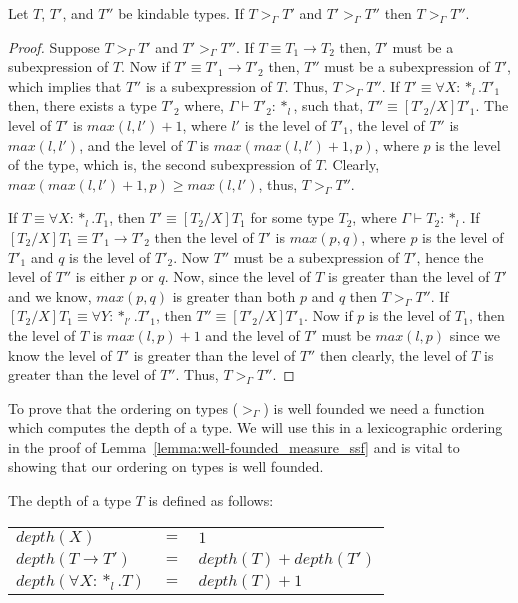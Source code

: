 \begin{lemma}
  Let $T$, $T'$, and $T''$ be kindable types.  If $T >_\Gamma T'$ and 
  $T' >_\Gamma T''$ then $T >_\Gamma T''$.
  \label{lemma:transitivity_ssf}
\end{lemma}
\begin{proof}
  Suppose $T >_\Gamma T'$ and $T' >_\Gamma T''$.  If 
  $T \equiv T_1 \rightarrow T_2$ then,
  $T'$ must be a subexpression of $T$.  Now if $T' \equiv T'_1 \rightarrow T'_2$ 
  then,
  $T''$ must be a subexpression of $T'$, which implies that $T''$ is a subexpression of 
  $T$.  Thus, $T >_\Gamma T''$.
  If $T' \equiv \forall X:*_l.T'_1$ then, there exists a type $T'_2$ where, 
  $\Gamma \vdash T'_2:*_l$, such that, 
  $T'' \equiv [T'_2/X]T'_1$.  The level of $T'$ is $max(l,l')+1$, where $l'$ is the 
  level of $T'_1$, the level of 
  $T''$ is $max(l,l')$, and the level of $T$ is $max(max(l,l')+1,p)$, where $p$ is the 
  level of the type, which is, the second subexpression of $T$.
  Clearly, $max(max(l,l')+1,p) \geq max(l,l')$, thus, $T >_\Gamma T''$.

  If $T \equiv \forall X:*_l.T_1$, then $T' \equiv [T_2/X]T_1$ for some type 
  $T_2$, where $\Gamma \vdash T_2:*_l$.  If
  $[T_2/X]T_1 \equiv T'_1 \rightarrow T'_2$ then the level of $T'$ is $max(p,q)$, where 
  $p$ is the level
  of $T'_1$ and $q$ is the level of $T'_2$.  Now $T''$ must be a subexpression of 
  $T'$, hence the level of $T''$ is either $p$ or $q$.  Now, since
  the level of $T$ is greater than the level of $T'$ and we know, $max(p,q)$ is greater 
  than both $p$ and $q$ then $T >_\Gamma T''$.  If 
  $[T_2/X]T_1 \equiv \forall Y:*_{l'}.T'_1$, then $T'' \equiv [T'_2/X]T'_1$.  
  Now if $p$ is the level of $T_1$, then the level of $T$ is
  $max(l,p)+1$ and the level of $T'$ must be $max(l,p)$ since we know the level of $T'$ is 
  greater than the level of $T''$ then clearly, the level of 
  $T$ is greater than the level of $T''$.  Thus, $T >_\Gamma T''$.
\end{proof}
\noindent
To prove that the ordering on types ($>_\Gamma$) is well founded we need
a function which computes the depth of a type.  We will use this in a
lexicographic ordering in the proof of
Lemma~\ref{lemma:well-founded_measure_ssf} and is vital to showing
that our ordering on types is well founded.

\begin{definition}
  The depth of a type $T$ is defined as follows:
  \begin{center}
    \begin{tabular}{lll}
      $depth(X)$                  & $=$ & $1$\\
      $depth(T \to T')$     & $=$ & $depth(T) + depth(T')$\\
      $depth(\forall X:*_l.T)$ & $=$ & $depth(T) + 1$\\
    \end{tabular}
  \end{center}
\end{definition}

